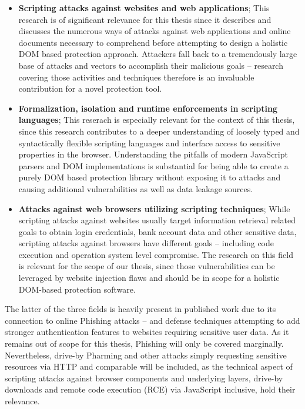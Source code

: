   \begin{itemize}
    \item \textbf{Scripting attacks against websites and web applications}; This research is of significant relevance for this thesis since it describes and discusses the numerous ways of attacks against web applications and online documents necessary to comprehend before attempting to design a holistic DOM based protection approach. Attackers fall back to a tremendously large base of attacks and vectors to accomplish their malicious goals -- research covering those activities and techniques therefore is an invaluable contribution for a novel protection tool.
    \item \textbf{Formalization, isolation and runtime enforcements in scripting languages}; This reserach is especially relevant for the context of this thesis, since this research contributes to a deeper understanding of loosely typed and syntactically flexible scripting languages and interface access to sensitive properties in the browser. Understanding the pitfalls of modern JavaScript parsers and DOM implementations is substantial for being able to create a purely DOM based protection library without exposing it to attacks and causing additional vulnerabilities as well as data leakage sources.
    \item \textbf{Attacks against web browsers utilizing scripting techniques}; While scripting attacks against websites usually target information retrieval related goals to obtain login credentials, bank account data and other sensitive data, scripting attacks against browsers have different goals -- including code execution and operation system level compromise. The research on this field is relevant for the scope of our thesis, since those vulnerabilities can be leveraged by website injection flaws and should be in scope for a holistic DOM-based protection software. 
  \end{itemize}

   The latter of the three fields is heavily present in published work due to its  connection to online Phishing attacks -- and defense techniques attempting to add stronger authentication features to websites requiring sensitive user data. As it remains out of scope for this thesis, Phishing will only be covered marginally. Nevertheless, drive-by Pharming and other attacks simply requesting sensitive resources via HTTP and comparable will be included, as the technical aspect of scripting attacks against browser components and underlying layers, drive-by downloads and remote code execution (RCE) via JavaScript inclusive, hold their relevance.

